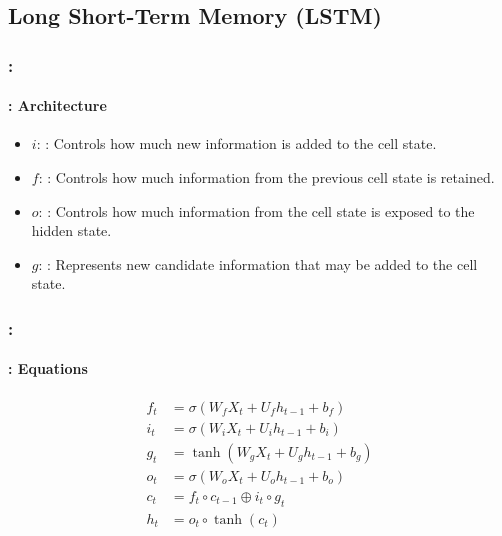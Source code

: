 \documentclass[xcolor=table]{beamer}
\begin{document}
\subsection{Long Short-Term Memory (LSTM)}

\begin{frame}
	\frametitle{\insertshortsubtitle: \insertsection}
	\framesubtitle{\insertsubsection: Architecture}
	
	\begin{minipage}{0.50\textwidth} 
		\begin{itemize}
			
			\item $i$: : 
			Controls how much new information is added to the cell state.
			
			\item $f$: : 
			Controls how much information from the previous cell state is retained.
			
		\end{itemize}
	\end{minipage}
	\begin{minipage}{0.49\textwidth}
	\end{minipage}
	
	
	\begin{itemize}
		\item $o$: : 
		Controls how much information from the cell state is exposed to the hidden state.
		\item $g$: : 
		Represents new candidate information that may be added to the cell state.
	\end{itemize}
	
\end{frame}

\begin{frame}
	\frametitle{\insertshortsubtitle: \insertsection}
	\framesubtitle{\insertsubsection: Equations}
	\huge\vskip-24pt
	\begin{align*}
		f_t &= \sigma(W_f X_t + U_f h_{t-1} + b_f) \\
		i_t &= \sigma(W_i X_t + U_i h_{t-1} + b_i) \\
		g_t &= \tanh(W_g X_t + U_g h_{t-1} + b_g) \\
		o_t &= \sigma(W_o X_t + U_o h_{t-1} + b_o) \\
		c_t &= f_t \circ c_{t-1} \oplus i_t \circ g_t \\
		h_t &= o_t \circ \tanh(c_t)
	\end{align*}
	
\end{frame}
\end{document}
